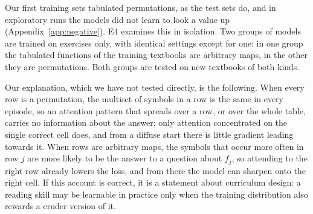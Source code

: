 Our first training sets tabulated permutations, as the test sets do, and in exploratory runs the models did not learn to look a value up (Appendix~\ref{app:negative}).
E4 examines this in isolation.
Two groups of models are trained on  exercises only, with identical settings except for one: in one group the tabulated functions of the training textbooks are arbitrary maps, in the other they are permutations.
Both groups are tested on new textbooks of both kinds.

\begin{table}[t]
\centering\small

\caption{E4:  accuracy (\%) after training on  only, with training tables that are arbitrary maps or permutations. Mean over seeds, followed by the number of seeds that ended at 95\% or above out of the number run. The last column gives, per seed, the first of the checkpoints (taken every 500 steps) at which accuracy on new permutation textbooks was at least 95\%. The guessing level is 20\% on permutation textbooks; on textbooks of arbitrary maps a model can exceed it by guessing a frequent symbol.}
\label{tab:e4}
\end{table}



Our explanation, which we have not tested directly, is the following.
When every row is a permutation, the multiset of symbols in a row is the same in every episode, so an attention pattern that spreads over a row, or over the whole table, carries no information about the answer; only attention concentrated on the single correct cell does, and from a diffuse start there is little gradient leading towards it.
When rows are arbitrary maps, the symbols that occur more often in row $j$ are more likely to be the answer to a question about $f_j$, so attending to the right row already lowers the loss, and from there the model can sharpen onto the right cell.
If this account is correct, it is a statement about curriculum design: a reading skill may be learnable in practice only when the training distribution also rewards a cruder version of it.
